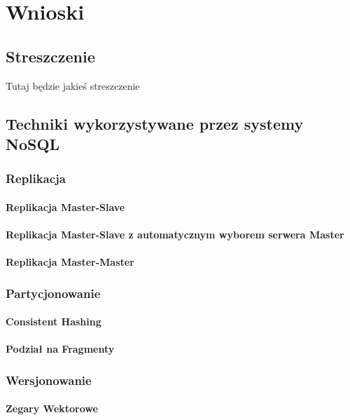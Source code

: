 \chapter{Wnioski}

\section*{Streszczenie}

Tutaj będzie jakieś streszczenie

\section{Techniki wykorzystywane przez systemy NoSQL}

\subsection*{Replikacja}
\subsubsection*{Replikacja Master-Slave}
\subsubsection*{Replikacja Master-Slave z automatycznym wyborem serwera Master}
\subsubsection*{Replikacja Master-Master}

\subsection*{Partycjonowanie}
\subsubsection*{Consistent Hashing}
\subsubsection*{Podział na Fragmenty}

\subsection*{Wersjonowanie}
\subsubsection*{Zegary Wektorowe}
